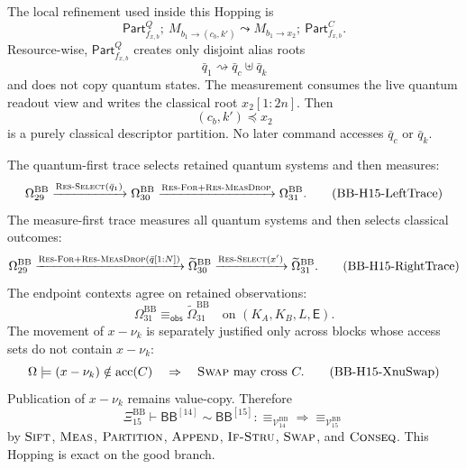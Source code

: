 \documentclass{report}
\theoremstyle{defn_style}
\providecommand{\acc}{\operatorname{acc}}
\providecommand{\HopBB}[1]{\mathsf{BB}^{[#1]}}
\begin{document}
The local refinement used inside this Hopping is
\[
  \mathsf{Part}^{Q}_{f_{x,b}};\ M_{b_1\to(c_b,k')}
  \leadsto
  M_{b_1\to x_2};\ \mathsf{Part}^{C}_{f_{x,b}}.
\tag{BB-H15-LocalSift}
\]
Resource-wise,
\(\mathsf{Part}^{Q}_{f_{x,b}}\) creates only disjoint alias roots
\[
  \bar q_1\rightsquigarrow \bar q_c\uplus \bar q_k
\tag{BB-H15-QPart}
\]
and does not copy quantum states.  The measurement consumes the live quantum
readout view and writes the classical root \(x_2[1{:}2n]\).  Then
\[
  (c_b,k')\preceq x_2
\tag{BB-H15-CPart}
\]
is a purely classical descriptor partition.  No later command accesses
\(\bar q_c\) or \(\bar q_k\).

The quantum-first trace selects retained quantum systems and then measures:
\[
\Omega^{\mathrm{BB}}_{29}
\xrightarrow{\textsc{Res-Select}(\bar q_1)}
\Omega^{\mathrm{BB}}_{30}
\xrightarrow{\textsc{Res-For}+\textsc{Res-MeasDrop}}
\Omega^{\mathrm{BB}}_{31}.
\tag{BB-H15-LeftTrace}\label{BB-H15-LeftTrace}
\]
The measure-first trace measures all quantum systems and then selects classical
outcomes:
\[
\Omega^{\mathrm{BB}}_{29}
\xrightarrow{\textsc{Res-For}+\textsc{Res-MeasDrop}(\bar q[1{:}N])}
\widetilde\Omega^{\mathrm{BB}}_{30}
\xrightarrow{\textsc{Res-Select}(x')}
\widetilde\Omega^{\mathrm{BB}}_{31}.
\tag{BB-H15-RightTrace}\label{BB-H15-RightTrace}
\]
The endpoint contexts agree on retained observations:
\[
\Omega^{\mathrm{BB}}_{31}
\equiv_{\mathsf{obs}}
\widetilde\Omega^{\mathrm{BB}}_{31}
\quad
\text{on }
(K_A,K_B,L,\mathsf E).
\tag{BB-H15-ObsEq}
\]
The movement of \(x-\nu_k\) is separately justified only across blocks whose
access sets do not contain \(x-\nu_k\):
\[
\Omega\models
(x-\nu_k)\notin\acc(C)
\quad
\Rightarrow
\quad
\textsc{Swap}\ \text{may cross }C.
\tag{BB-H15-XnuSwap}
\]
Publication of \(x-\nu_k\) remains value-copy.  Therefore
\[
\Xi^{\mathrm{BB}}_{15}
\vdash
\HopBB{14}\sim\HopBB{15}:
\equiv_{\mathcal V^{\mathrm{BB}}_{14}}
\Longrightarrow
\equiv_{\mathcal V^{\mathrm{BB}}_{15}}
\tag{BB-H15-Rel}\label{BB-H15-Rel}
\]
by \(\textsc{Sift}\), \(\textsc{Meas}\), \(\textsc{Partition}\),
\(\textsc{Append}\), \(\textsc{If-Stru}\), \(\textsc{Swap}\), and
\(\textsc{Conseq}\).  This Hopping is exact on the good branch.
\end{document}

